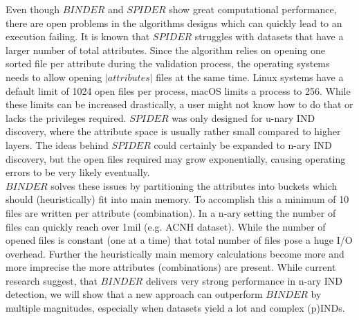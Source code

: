 Even though $BINDER$ and $SPIDER$ show great computational performance, there are open problems in the algorithms designs which can quickly lead to an execution failing. It is known that $SPIDER$ struggles with datasets that have a larger number of total attributes. Since the algorithm relies on opening one sorted file per attribute during the validation process, the operating systems needs to allow opening $|attributes|$ files at the same time. Linux systems have a default limit of 1024 open files per process, macOS limits a process to 256. While these limits can be increased drastically, a user might not know how to do that or lacks the privileges required. $SPIDER$ was only designed for u-nary IND discovery, where the attribute space is usually rather small compared to higher layers. The ideas behind $SPIDER$ could certainly be expanded to n-ary IND discovery, but the open files required may grow exponentially, causing operating errors to be very likely eventually. \\

\noindent $BINDER$ solves these issues by partitioning the attributes into buckets which should (heuristically) fit into main memory. To accomplish this a minimum of 10 files are written per attribute (combination). In a n-ary setting the number of files can quickly reach over 1mil (e.g. ACNH dataset). While the number of opened files is constant (one at a time) that total number of files pose a huge I/O overhead. Further the heuristically main memory calculations become more and more imprecise the more attributes (combinations) are present. While current research suggest, that $BINDER$ delivers very strong performance in n-ary IND detection, we will show that a new approach can outperform $BINDER$ by multiple magnitudes, especially when datasets yield a lot and complex (p)INDs.
